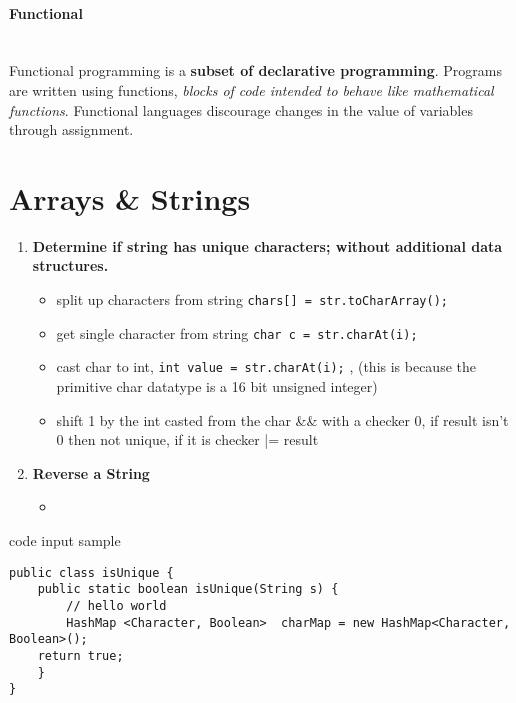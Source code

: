 \documentclass[10pt]{article}
\def\code#1{\colorbox{pgrey}{\texttt{#1}}}
\begin{document}
\paragraph{Functional}\ \\
Functional programming is a {\bf subset of declarative programming}. Programs are written using functions, {\it blocks of code intended to behave like mathematical functions}. Functional languages discourage changes in the value of variables through assignment.   

\section{Arrays \& Strings}\smallskip
\begin{enumerate}

\item {\bf Determine if string has unique characters; without additional data structures.}

\begin{itemize}
\item split up characters from string \code{chars[] = str.toCharArray();}
\item get single character from string \code{char c = str.charAt(i);}
\item cast char to int, \code{int value = str.charAt(i);} , (this is because the primitive char datatype is a 16 bit unsigned integer)
\item shift 1 by the int casted from the char \&\& with a checker 0, if result isn't 0 then not unique, if it is checker |= result
\end{itemize}

\item {\bf Reverse a String}

\begin{itemize}
\item 
\end{itemize}
\end{enumerate}






\newpage
\noindent\makebox[\linewidth]{\rule{\paperwidth}{0.4pt}}

code input sample
\begin{lstlisting}[frame=single]
public class isUnique {
	public static boolean isUnique(String s) {
		// hello world
		HashMap <Character, Boolean>  charMap = new HashMap<Character, Boolean>();
	return true;
	}
}
\end{lstlisting}
\end{document}
